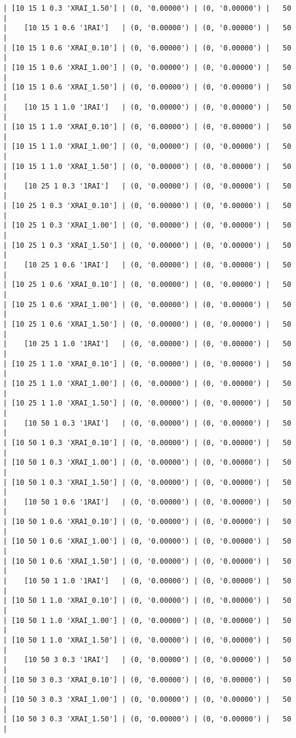 \documentclass{article}
\begin{document}
\begin{verbatim}
| [10 15 1 0.3 'XRAI_1.50'] | (0, '0.00000') | (0, '0.00000') |   50  |
|    [10 15 1 0.6 '1RAI']   | (0, '0.00000') | (0, '0.00000') |   50  |
| [10 15 1 0.6 'XRAI_0.10'] | (0, '0.00000') | (0, '0.00000') |   50  |
| [10 15 1 0.6 'XRAI_1.00'] | (0, '0.00000') | (0, '0.00000') |   50  |
| [10 15 1 0.6 'XRAI_1.50'] | (0, '0.00000') | (0, '0.00000') |   50  |
|    [10 15 1 1.0 '1RAI']   | (0, '0.00000') | (0, '0.00000') |   50  |
| [10 15 1 1.0 'XRAI_0.10'] | (0, '0.00000') | (0, '0.00000') |   50  |
| [10 15 1 1.0 'XRAI_1.00'] | (0, '0.00000') | (0, '0.00000') |   50  |
| [10 15 1 1.0 'XRAI_1.50'] | (0, '0.00000') | (0, '0.00000') |   50  |
|    [10 25 1 0.3 '1RAI']   | (0, '0.00000') | (0, '0.00000') |   50  |
| [10 25 1 0.3 'XRAI_0.10'] | (0, '0.00000') | (0, '0.00000') |   50  |
| [10 25 1 0.3 'XRAI_1.00'] | (0, '0.00000') | (0, '0.00000') |   50  |
| [10 25 1 0.3 'XRAI_1.50'] | (0, '0.00000') | (0, '0.00000') |   50  |
|    [10 25 1 0.6 '1RAI']   | (0, '0.00000') | (0, '0.00000') |   50  |
| [10 25 1 0.6 'XRAI_0.10'] | (0, '0.00000') | (0, '0.00000') |   50  |
| [10 25 1 0.6 'XRAI_1.00'] | (0, '0.00000') | (0, '0.00000') |   50  |
| [10 25 1 0.6 'XRAI_1.50'] | (0, '0.00000') | (0, '0.00000') |   50  |
|    [10 25 1 1.0 '1RAI']   | (0, '0.00000') | (0, '0.00000') |   50  |
| [10 25 1 1.0 'XRAI_0.10'] | (0, '0.00000') | (0, '0.00000') |   50  |
| [10 25 1 1.0 'XRAI_1.00'] | (0, '0.00000') | (0, '0.00000') |   50  |
| [10 25 1 1.0 'XRAI_1.50'] | (0, '0.00000') | (0, '0.00000') |   50  |
|    [10 50 1 0.3 '1RAI']   | (0, '0.00000') | (0, '0.00000') |   50  |
| [10 50 1 0.3 'XRAI_0.10'] | (0, '0.00000') | (0, '0.00000') |   50  |
| [10 50 1 0.3 'XRAI_1.00'] | (0, '0.00000') | (0, '0.00000') |   50  |
| [10 50 1 0.3 'XRAI_1.50'] | (0, '0.00000') | (0, '0.00000') |   50  |
|    [10 50 1 0.6 '1RAI']   | (0, '0.00000') | (0, '0.00000') |   50  |
| [10 50 1 0.6 'XRAI_0.10'] | (0, '0.00000') | (0, '0.00000') |   50  |
| [10 50 1 0.6 'XRAI_1.00'] | (0, '0.00000') | (0, '0.00000') |   50  |
| [10 50 1 0.6 'XRAI_1.50'] | (0, '0.00000') | (0, '0.00000') |   50  |
|    [10 50 1 1.0 '1RAI']   | (0, '0.00000') | (0, '0.00000') |   50  |
| [10 50 1 1.0 'XRAI_0.10'] | (0, '0.00000') | (0, '0.00000') |   50  |
| [10 50 1 1.0 'XRAI_1.00'] | (0, '0.00000') | (0, '0.00000') |   50  |
| [10 50 1 1.0 'XRAI_1.50'] | (0, '0.00000') | (0, '0.00000') |   50  |
|    [10 50 3 0.3 '1RAI']   | (0, '0.00000') | (0, '0.00000') |   50  |
| [10 50 3 0.3 'XRAI_0.10'] | (0, '0.00000') | (0, '0.00000') |   50  |
| [10 50 3 0.3 'XRAI_1.00'] | (0, '0.00000') | (0, '0.00000') |   50  |
| [10 50 3 0.3 'XRAI_1.50'] | (0, '0.00000') | (0, '0.00000') |   50  |

\end{verbatim}
\end{document}
